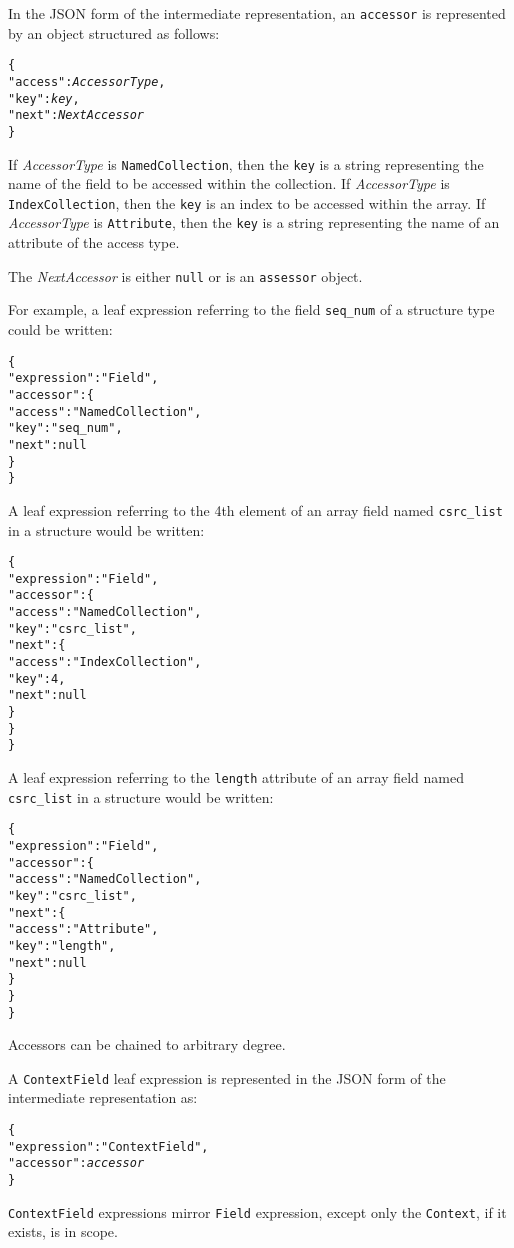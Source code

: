 \documentclass[10pt,twocolumn,a4paper]{article}
\newcommand{\code}[1]{\texttt{#1}}
\begin{document}
In the JSON form of the intermediate representation, an \code{accessor} is
represented by an object structured as follows:
\footnotesize
\begin{alltt}
  \{
    "access" : \emph{AccessorType},
    "key"    : \emph{key},
    "next"   : \emph{NextAccessor}
  \}
\end{alltt}
\normalsize

If \emph{AccessorType} is \code{NamedCollection}, then the \code{key}
is a string representing the name of the field to be accessed within the
collection.
%
If \emph{AccessorType} is \code{IndexCollection}, then the \code{key} is
an index to be accessed within the array.
%
If \emph{AccessorType} is \code{Attribute}, then the \code{key} is a string
representing the name of an attribute of the access type.

The \emph{NextAccessor} is either \code{null} or is an \code{assessor}
object.


For example, a leaf expression referring to the field \code{seq\_num} of a
structure type could be written:
\footnotesize
\begin{alltt}
  \{
    "expression" : "Field",
    "accessor" : \{
      "access" : "NamedCollection",
      "key"    : "seq\_num",
      "next"   : null
    \}
  \}
\end{alltt}
\normalsize
A leaf expression referring to the 4th element of an array field named
\code{csrc\_list} in a structure would be written:
\footnotesize
\begin{alltt}
  \{
    "expression" : "Field",
    "accessor" : \{
      "access" : "NamedCollection",
      "key"    : "csrc\_list",
      "next"   : \{
        "access" : "IndexCollection",
        "key" : 4,
        "next" : null
      \}
    \}
  \}
\end{alltt}
\normalsize
A leaf expression referring to the \code{length} attribute of an array
field named \code{csrc\_list} in a structure would be written:
\footnotesize
\begin{alltt}
  \{
    "expression" : "Field",
    "accessor" : \{
      "access" : "NamedCollection",
      "key"    : "csrc\_list",
      "next"   : \{
        "access" : "Attribute",
        "key"    : "length",
        "next"   : null
      \}
    \}
  \}
\end{alltt}
\normalsize

Accessors can be chained to arbitrary degree.

A \code{ContextField} leaf expression is represented in the JSON form of the
intermediate representation as:
\footnotesize
\begin{alltt}
  \{
    "expression"   : "ContextField",
    "accessor"     : \emph{accessor}
  \}
\end{alltt}
\normalsize
\code{ContextField} expressions mirror \code{Field} expression, except only the
\code{Context}, if it exists, is in scope.
\end{document}
